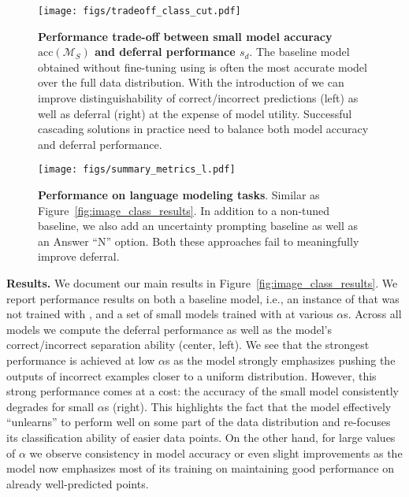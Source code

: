 \begin{figure}[t]
    \centering
    \texttt{[image: figs/tradeoff\_class\_cut.pdf]}
    \vspace{-20pt}
    \caption{\textbf{Performance trade-off between small model accuracy $\text{acc}(\mathcal{M}_S)$ and deferral performance $s_d$}. The baseline model obtained without fine-tuning using \loss is often the most accurate model over the full data distribution. With the introduction of \loss we can improve distinguishability of correct/incorrect predictions (left) as well as deferral (right) at the expense of model utility. Successful cascading solutions in practice need to balance both model accuracy and deferral performance.}
    \label{fig:tradeoffs}
\end{figure}

\begin{figure*}[t]
    \centering
    \texttt{[image: figs/summary\_metrics\_l.pdf]}
    \vspace{-20pt}
    \caption{\textbf{Performance on language modeling tasks}. Similar as Figure~\ref{fig:image_class_results}. In addition to a non-tuned baseline, we also add an uncertainty prompting baseline as well as an Answer ``N'' option. Both these approaches fail to meaningfully improve deferral.}
    \label{fig:l_results}
\end{figure*}

\textbf{Results.} We document our main results in Figure~\ref{fig:image_class_results}. We report performance results on both a baseline model, i.e., an instance of \smallmodel that was not trained with \loss, and a set of small models trained with \loss at various $\alpha$s. Across all models we compute the deferral performance as well as the model's correct/incorrect separation ability (center, left). We see that the strongest performance is achieved at low $\alpha$s as the model strongly emphasizes pushing the outputs of incorrect examples closer to a uniform distribution. However, this strong performance comes at a cost: the accuracy of the small model consistently degrades for small $\alpha$s (right). This highlights the fact that the model effectively ``unlearns'' to perform well on some part of the data distribution and re-focuses its classification ability of easier data points. On the other hand, for large values of $\alpha$ we observe consistency in model accuracy or even slight improvements as the model now emphasizes most of its training on maintaining good performance on already well-predicted points. 

